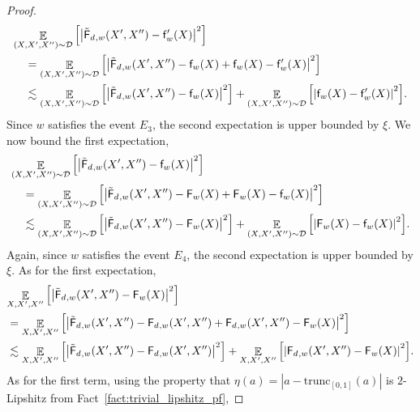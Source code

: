 \documentclass[10pt,a4paper]{amsart}
\newcommand\card[1]{\left| {#1} \right|}
\newcommand\Expect[2]{{\mathop{\mathbb{E}}_{#1}\left[ {#2} \right]}}
\newcommand{\V}[1]{{#1}}
\begin{document}
\begin{proof}
\begin{align*}
    &\Expect{(X,X',X'')\sim \mathcal{D}}{\card{\truncfcoarsedecoupled_{,\V w}(X',X'') - \noisyfrefined_{\V w}(X)}^2}\\
    &\quad = \Expect{(X,X',X'')\sim \mathcal{D}}{\card{\truncfcoarsedecoupled_{,\V w}(X',X'') - \noisyfcoarse_{\V w}(X) + \noisyfcoarse_{\V w}(X) - \noisyfrefined_{\V w}(X)}^2}\\
    &\quad \lesssim \Expect{(X,X',X'')\sim \mathcal{D}}{\card{\truncfcoarsedecoupled_{,\V w}(X',X'') - \noisyfcoarse_{\V w}(X)}^2} + \Expect{(X,X',X'')\sim \mathcal{D}}{\card{ \noisyfcoarse_{\V w}(X) - \noisyfrefined_{\V w}(X)}^2}.
\end{align*}
Since $\V w$ satisfies the event $E_3$, the second expectation is upper bounded by $\xi$. We now bound the first expectation,
\begin{align*}
&\Expect{(X,X',X'')\sim \mathcal{D}}{\card{\truncfcoarsedecoupled_{,\V w}(X',X'') - \noisyfcoarse_{\V w}(X)}^2} \\
&\quad = \Expect{(X,X',X'')\sim \mathcal{D}}{\card{\truncfcoarsedecoupled_{,\V w}(X',X'') - \fcoarsedecomposed_{\V w}(X) + \fcoarsedecomposed_{\V w}(X)- \noisyfcoarse_{\V w}(X)}^2} \\
&\quad \lesssim \Expect{(X,X',X'')\sim \mathcal{D}}{\card{\truncfcoarsedecoupled_{,\V w}(X',X'') - \fcoarsedecomposed_{\V w}(X)}^2}  + \Expect{(X,X',X'')\sim \mathcal{D}}{\card{\fcoarsedecomposed_{\V w}(X)- \noisyfcoarse_{\V w}(X)}^2}.
\end{align*}
Again, since $\V w$ satisfies the event $E_4$, the second expectation is upper bounded by $\xi$. As for the first expectation,
 \begin{align}
        &\Expect{X, X', X''}{\card{\truncfcoarsedecoupled_{, \V w} (X',X'') - \fcoarsedecomposed_{\V w}(X)}^2} \nonumber\\
        & = \Expect{X, X', X''}{\card{\truncfcoarsedecoupled_{, \V w}(X',X'') - \fcoarsedecoupled_{, \V w}(X',X'')  + \fcoarsedecoupled_{, \V w}(X',X'') - \fcoarsedecomposed_{\V w}(X)}^2}\nonumber\\
        & \lesssim \Expect{X, X', X''}{\card{\truncfcoarsedecoupled_{, \V w}(X',X'') - \fcoarsedecoupled_{, \V w}(X',X'')}^2} + \Expect{X, X', X''}{\card{\fcoarsedecoupled_{, \V w}(X',X'') - \fcoarsedecomposed_{\V w}(X)}^2}.\label{eq:two_exp_lemma_3wise_decouple}
    \end{align}
%
As for the first term, using the property that $\eta(a) = \card{a-\mathrm{trunc}_{[0,1]}(a)}$ is $2$-Lipshitz from Fact~\ref{fact:trivial_lipshitz_pf},

\end{proof}
\end{document}
